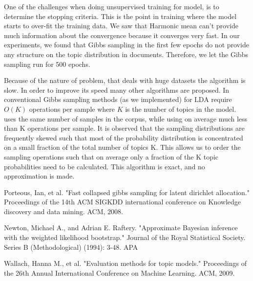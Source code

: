 \documentclass[twoside,12pt]{article}
\begin{document}
One of the challenges when doing unsupervised training for model, is to determine the stopping criteria. This is the point in training where the model starts to over-fit the training data. We saw that Harmonic mean can't provide much information about the convergence because it converges very fast. In our experiments, we found that Gibbs sampling in the first few epochs do not provide any structure on the topic distribution in documents. Therefore, we let the Gibbs sampling run for 500 epochs.  

Because of the nature of problem, that deals with huge datasets the algorithm is slow. In order to improve its speed many other algorithms are proposed. In conventional Gibbs sampling methods (as we implemented) for LDA require $O(K)$ operations per sample where $K$ is the number of topics in the model. \cite{fastlda} uses the same number of samples in the corpus, while using on average much less than K operations per sample. It is observed that the sampling distributions are frequently skewed such that most of the probability distribution is concentrated on a small fraction of the total number of topics K. This allows us to order the sampling operations such that on average only a fraction of the K topic probabilities need to be calculated. This algorithm is exact, and no approximation is made.

\begin{thebibliography}{9}
Porteous, Ian, et al. "Fast collapsed gibbs sampling for latent dirichlet allocation." Proceedings of the 14th ACM SIGKDD international conference on Knowledge discovery and data mining. ACM, 2008.


Newton, Michael A., and Adrian E. Raftery. "Approximate Bayesian inference with the weighted likelihood bootstrap." Journal of the Royal Statistical Society. Series B (Methodological) (1994): 3-48.
APA	

Wallach, Hanna M., et al. "Evaluation methods for topic models." Proceedings of the 26th Annual International Conference on Machine Learning. ACM, 2009.

\end{thebibliography}
\end{document}
